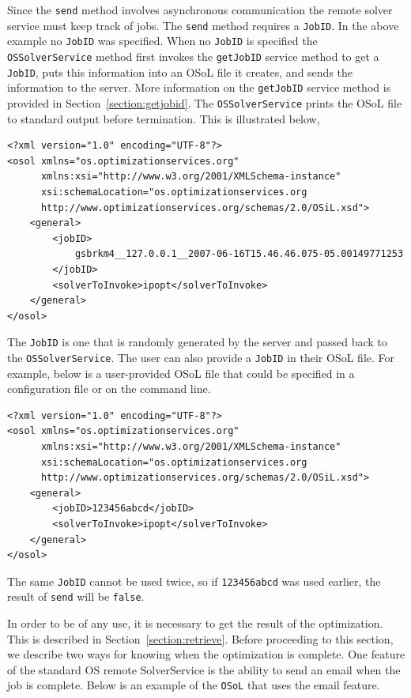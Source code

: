Since the {\tt send} method involves asynchronous communication the remote solver service must keep track of jobs.
The {\tt send} method requires a {\tt JobID}. In the above example no {\tt JobID} was specified.
When no {\tt JobID} is specified the {\tt OSSolverService} method first invokes the {\tt getJobID} service method
to get a {\tt JobID}, puts this information into an OSoL file it creates, and sends the information
to the server. More information on the {\tt getJobID} service method is provided in Section~\ref{section:getjobid}.
The {\tt OSSolverService} prints the OSoL file to standard output before termination.
This is illustrated below,

\begin{verbatim}
<?xml version="1.0" encoding="UTF-8"?>
<osol xmlns="os.optimizationservices.org"
      xmlns:xsi="http://www.w3.org/2001/XMLSchema-instance"
      xsi:schemaLocation="os.optimizationservices.org
      http://www.optimizationservices.org/schemas/2.0/OSiL.xsd">
    <general>
        <jobID>
            gsbrkm4__127.0.0.1__2007-06-16T15.46.46.075-05.00149771253
        </jobID>
        <solverToInvoke>ipopt</solverToInvoke>      
    </general>
</osol>
\end{verbatim}

The {\tt JobID} is one that is randomly generated by the server and passed back to the {\tt OSSolverService}.
The user can also provide a {\tt JobID} in their OSoL file. For example, below is a user-provided OSoL file that could
be specified in a configuration file or on the command line.

\begin{verbatim}
<?xml version="1.0" encoding="UTF-8"?>
<osol xmlns="os.optimizationservices.org"
      xmlns:xsi="http://www.w3.org/2001/XMLSchema-instance"
      xsi:schemaLocation="os.optimizationservices.org
      http://www.optimizationservices.org/schemas/2.0/OSiL.xsd">
    <general>
        <jobID>123456abcd</jobID>
        <solverToInvoke>ipopt</solverToInvoke>      
    </general>
</osol>
\end{verbatim}

The same {\tt JobID} cannot be used twice, so if {\tt 123456abcd} was used earlier, the result of {\tt send} will be
{\tt false}.

In order to be of any use, it is necessary to get the result of the optimization. This is described in
Section~\ref{section:retrieve}. Before proceeding to this section, we describe two ways for knowing when
the optimization is complete. One feature of the standard OS remote SolverService is the ability to send an
email when the job is complete. Below is an example of the {\tt OSoL} that uses the email feature.

